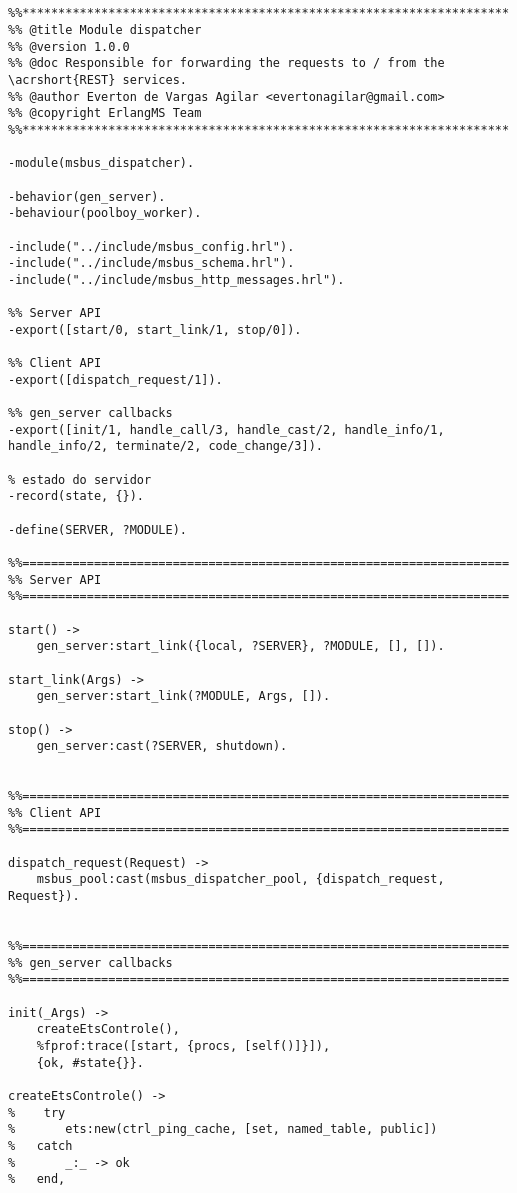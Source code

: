 \begin{lstlisting} 


%%********************************************************************
%% @title Module dispatcher
%% @version 1.0.0
%% @doc Responsible for forwarding the requests to / from the \acrshort{REST} services.
%% @author Everton de Vargas Agilar <evertonagilar@gmail.com>
%% @copyright ErlangMS Team
%%********************************************************************

-module(msbus_dispatcher).

-behavior(gen_server). 
-behaviour(poolboy_worker).

-include("../include/msbus_config.hrl").
-include("../include/msbus_schema.hrl").
-include("../include/msbus_http_messages.hrl").

%% Server API
-export([start/0, start_link/1, stop/0]).

%% Client API
-export([dispatch_request/1]).

%% gen_server callbacks
-export([init/1, handle_call/3, handle_cast/2, handle_info/1, handle_info/2, terminate/2, code_change/3]).

% estado do servidor
-record(state, {}).

-define(SERVER, ?MODULE).

%%====================================================================
%% Server API
%%====================================================================

start() -> 
    gen_server:start_link({local, ?SERVER}, ?MODULE, [], []).
 
start_link(Args) ->
    gen_server:start_link(?MODULE, Args, []).

stop() ->
    gen_server:cast(?SERVER, shutdown).
 

%%====================================================================
%% Client API
%%====================================================================

dispatch_request(Request) -> 
	msbus_pool:cast(msbus_dispatcher_pool, {dispatch_request, Request}).

 
%%====================================================================
%% gen_server callbacks
%%====================================================================
 
init(_Args) ->
    createEtsControle(),
    %fprof:trace([start, {procs, [self()]}]),
    {ok, #state{}}.
 
createEtsControle() ->
%    try
%		ets:new(ctrl_ping_cache, [set, named_table, public])
%	catch
%		_:_ -> ok
%	end,


\end{lstlisting}
